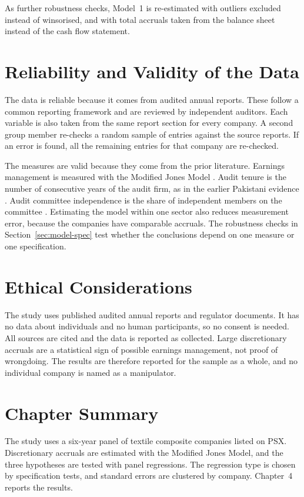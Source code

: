 As further robustness checks, Model~1 is re-estimated with outliers excluded instead of winsorised, and with total accruals taken from the balance sheet instead of the cash flow statement.

\section{Reliability and Validity of the Data}

The data is reliable because it comes from audited annual reports. These follow a common reporting framework and are reviewed by independent auditors. Each variable is also taken from the same report section for every company. A second group member re-checks a random sample of entries against the source reports. If an error is found, all the remaining entries for that company are re-checked.

The measures are valid because they come from the prior literature. Earnings management is measured with the Modified Jones Model \parencite{dechow1995}. Audit tenure is the number of consecutive years of the audit firm, as in the earlier Pakistani evidence \parencite{kalabeke2019}. Audit committee independence is the share of independent members on the committee \parencite{klein2002}. Estimating the model within one sector also reduces measurement error, because the companies have comparable accruals. The robustness checks in Section~\ref{sec:model-spec} test whether the conclusions depend on one measure or one specification.

\section{Ethical Considerations}

The study uses published audited annual reports and regulator documents. It has no data about individuals and no human participants, so no consent is needed. All sources are cited and the data is reported as collected. Large discretionary accruals are a statistical sign of possible earnings management, not proof of wrongdoing. The results are therefore reported for the sample as a whole, and no individual company is named as a manipulator.

\section{Chapter Summary}

The study uses a six-year panel of textile composite companies listed on PSX. Discretionary accruals are estimated with the Modified Jones Model, and the three hypotheses are tested with panel regressions. The regression type is chosen by specification tests, and standard errors are clustered by company. Chapter~4 reports the results.
